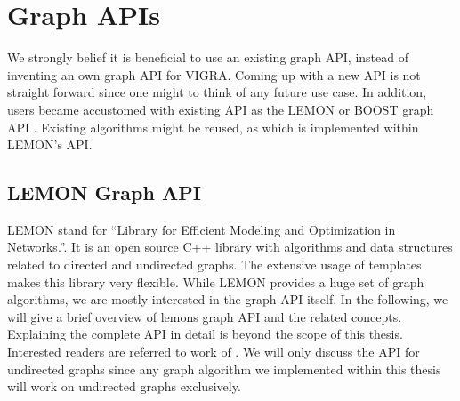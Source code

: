 
\section{Graph APIs}\label{sec:graph_apis}



We strongly belief it is beneficial to use an existing graph API,
instead of inventing an own graph API for VIGRA.
Coming up with a new API is not straight forward
since one might to think of any future use case.
In addition, users became accustomed with existing API as 
the LEMON \citep{lemon_lib} or BOOST graph API \citep{ boost_bgl}.
Existing algorithms might be reused, as \cite{straehle_2011_miccai} which is implemented 
within LEMON's API.






\subsection{LEMON Graph API}\label{sec:lemon_graph_apis}
    LEMON \citep{ lemon_lib} 
    stand for  ``Library for Efficient Modeling and Optimization in Networks.''.
    It is an open source C++ library with algorithms and data structures 
    related to directed and undirected graphs.
    The extensive usage of templates makes this library very flexible.
    While LEMON provides a huge set of graph algorithms,
    we are mostly interested in the graph API itself.
    In the following, we will give a brief overview of lemons graph 
    API and the related concepts.
    Explaining the complete  API in detail
    is beyond the scope of this thesis.
    Interested readers are referred to work of \citet{lemon_lib}.
    We will only discuss the API for undirected graphs since any
    graph algorithm we implemented within this thesis
    will work on undirected graphs exclusively.

